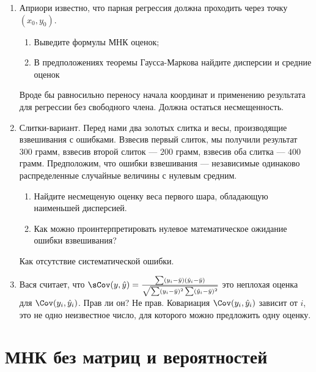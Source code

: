 \documentclass[pdftex,12pt,a4paper]{article}
\def \hy{\hat{y}}
\newcommand{\solution}[1]{ {\tiny #1} }
\newcommand{\problem}[1]{#1}
\begin{document}
\begin{enumerate}
\item Априори известно, что парная регрессия должна проходить через точку $(x_{0},y_{0})$.
\begin{enumerate}
\item  Выведите формулы МНК оценок;
\item В предположениях теоремы Гаусса-Маркова найдите дисперсии и средние оценок 
\end{enumerate}

\solution{Вроде бы равносильно переносу начала координат и применению результата для регрессии без свободного члена. Должна остаться несмещенность. }




\item \problem{ Слитки-вариант. Перед нами два золотых слитка и весы, производящие взвешивания с ошибками. Взвесив первый слиток, мы получили результат $300$ грамм, взвесив второй слиток --- $200$ грамм, взвесив оба слитка --- $400$ грамм. Предположим, что ошибки взвешивания --- независимые одинаково распределенные случайные величины с нулевым средним. 
\begin{enumerate}
\item Найдите несмещеную оценку веса первого шара, обладающую наименьшей дисперсией.
\item Как можно проинтерпретировать нулевое математическое ожидание ошибки взвешивания? 
\end{enumerate} }
\solution{ Как отсутствие систематической ошибки.} 

\item Вася считает, что $\sCov(y,\hy)=\frac{\sum (y_i-\bar{y})(\hy_i-\bar{y})}{\sqrt{\sum (y_i-\bar{y})^2 \sum (\hy_i-\bar{y})^2}}$ это неплохая оценка для $\Cov(y_i,\hy_i)$. Прав ли он?
\solution{Не прав. Ковариация $\Cov(y_i,\hy_i)$ зависит от $i$, это не одно неизвестное число, для которого можно предложить одну оценку.}


\end{enumerate}

\section{МНК без матриц и вероятностей}
\end{document}
